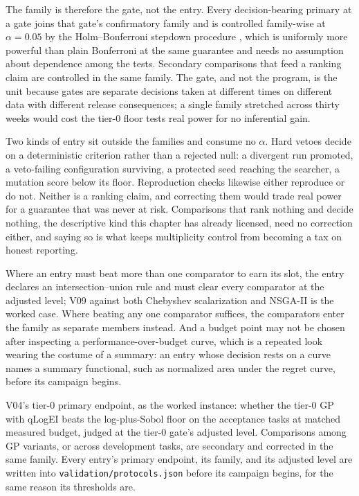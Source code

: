 The family is therefore the gate, not the entry. Every decision-bearing
primary at a gate joins that gate's confirmatory family and is
controlled family-wise at $\alpha = 0.05$ by the Holm--Bonferroni
stepdown procedure \citep{holm1979simple}, which is uniformly more
powerful than plain Bonferroni at the same guarantee and needs no
assumption about dependence among the tests. Secondary comparisons that
feed a ranking claim are controlled in the same family. The gate, and
not the program, is the unit because gates are separate decisions taken
at different times on different data with different release
consequences; a single family stretched across thirty weeks would cost
the tier-0 floor tests real power for no inferential gain.

Two kinds of entry sit outside the families and consume no
$\alpha$. Hard vetoes decide on a deterministic criterion rather than a
rejected null: a divergent run promoted, a veto-failing configuration
surviving, a protected seed reaching the searcher, a mutation score
below its floor. Reproduction checks likewise either reproduce or do
not. Neither is a ranking claim, and correcting them would trade real
power for a guarantee that was never at risk. Comparisons that rank
nothing and decide nothing, the descriptive kind this chapter has
already licensed, need no correction either, and saying so is what
keeps multiplicity control from becoming a tax on honest reporting.

Where an entry must beat more than one comparator to earn its slot, the
entry declares an intersection--union rule and must clear every
comparator at the adjusted level; V09 against both Chebyshev
scalarization and NSGA-II is the worked case. Where beating any one
comparator suffices, the comparators enter the family as separate
members instead. And a budget point may not be chosen after inspecting
a performance-over-budget curve, which is a repeated look wearing the
costume of a summary: an entry whose decision rests on a curve names a
summary functional, such as normalized area under the regret curve,
before its campaign begins.

V04's tier-0 primary endpoint, as the worked instance: whether the
tier-0 GP with qLogEI beats the log-plus-Sobol floor on the acceptance
tasks at matched measured budget, judged at the tier-0 gate's adjusted
level. Comparisons among GP variants, or across development tasks, are
secondary and corrected in the same family. Every entry's primary
endpoint, its family, and its adjusted level are written into
\texttt{validation/protocols.json} before its campaign begins, for the
same reason its thresholds are.

